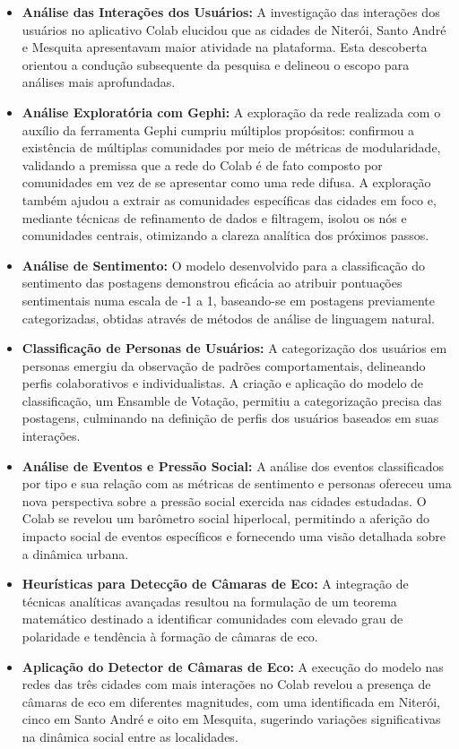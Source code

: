 \begin{itemize}
	\item \textbf{Análise das Interações dos Usuários:}
	      A investigação das interações dos usuários no aplicativo Colab elucidou que as cidades de Niterói, Santo André e Mesquita apresentavam maior atividade na plataforma. Esta descoberta orientou a condução subsequente da pesquisa e delineou o escopo para análises mais aprofundadas.

	\item \textbf{Análise Exploratória com Gephi:}
	      A exploração da rede realizada com o auxílio da ferramenta Gephi cumpriu múltiplos propósitos: confirmou a existência de múltiplas comunidades por meio de métricas de modularidade, validando a premissa que a rede do Colab é de fato composto por comunidades em vez de se apresentar como uma rede difusa. A exploração também ajudou a extrair as comunidades específicas das cidades em foco e, mediante técnicas de refinamento de dados e filtragem, isolou os nós e comunidades centrais, otimizando a clareza analítica dos próximos passos.

	\item \textbf{Análise de Sentimento:}
	      O modelo desenvolvido para a classificação do sentimento das postagens demonstrou eficácia ao atribuir pontuações sentimentais numa escala de -1 a 1, baseando-se em postagens previamente categorizadas, obtidas através de métodos de análise de linguagem natural.

	\item \textbf{Classificação de Personas de Usuários:}
	      A categorização dos usuários em personas emergiu da observação de padrões comportamentais, delineando perfis colaborativos e individualistas. A criação e aplicação do modelo de classificação, um Ensamble de Votação, permitiu a categorização precisa das postagens, culminando na definição de perfis dos usuários baseados em suas interações.

	\item \textbf{Análise de Eventos e Pressão Social:}
	      A análise dos eventos classificados por tipo e sua relação com as métricas de sentimento e personas ofereceu uma nova perspectiva sobre a pressão social exercida nas cidades estudadas. O Colab se revelou um barômetro social hiperlocal, permitindo a aferição do impacto social de eventos específicos e fornecendo uma visão detalhada sobre a dinâmica urbana.

	\item \textbf{Heurísticas para Detecção de Câmaras de Eco:}
	      A integração de técnicas analíticas avançadas resultou na formulação de um teorema matemático destinado a identificar comunidades com elevado grau de polaridade e tendência à formação de câmaras de eco.

	\item \textbf{Aplicação do Detector de Câmaras de Eco:}
	      A execução do modelo nas redes das três cidades com mais interações no Colab revelou a presença de câmaras de eco em diferentes magnitudes, com uma identificada em Niterói, cinco em Santo André e oito em Mesquita, sugerindo variações significativas na dinâmica social entre as localidades.

\end{itemize}

